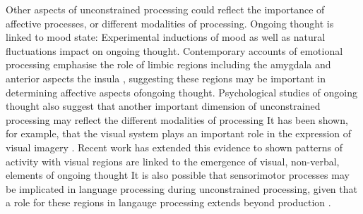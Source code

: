 Other aspects of unconstrained processing could reflect the importance of affective processes, or different modalities of processing. Ongoing thought is linked to mood state: Experimental inductions of mood \cite{SmallwoodEmotion2009,Smallwood2011}
as well as natural fluctuations \cite{Poerio2013, RubyPlos2013}
impact on ongoing thought. Contemporary accounts of emotional processing emphasise the role of limbic regions including the amygdala \cite{Bzdok2013,Lindquist2012}%
and anterior aspects the insula \cite{Touroutoglou2012},%
suggesting these regions may be important in determining affective aspects ofongoing thought. Psychological studies of ongoing thought also suggest that another important dimension of unconstrained processing may reflect the different modalities of processing \cite{Konishi2017,Smallwood2016}%
It has been shown, for example, that the visual system plays an important role in the expression of visual imagery \cite{Ganis2004,Kosslyn2001}.%
Recent work has extended this evidence to shown patterns of activity with visual regions are linked to the emergence of visual, non-verbal, elements of ongoing thought \cite{Raij2017}%
It is also possible that sensorimotor processes may be implicated in language processing during unconstrained processing, given that a role for these regions in langauge processing extends beyond production \cite{Bzdok2016,Pulvermuller2010,Pulvermuller2010a}.

